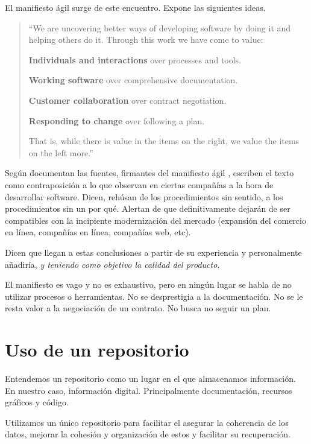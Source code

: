 El manifiesto ágil \cite{ManifiestoAgil} surge de este encuentro. Expone las siguientes ideas.

\begin{quote}
    \itshape{
    ``We are uncovering better ways of developing
    software by doing it and helping others do it.
    Through this work we have come to value:
    
    \textbf{Individuals and interactions} over processes and tools.

    \textbf{Working software} over comprehensive documentation.

    \textbf{Customer collaboration} over contract negotiation.

    \textbf{Responding to change} over following a plan.
    
    That is, while there is value in the items on
    the right, we value the items on the left more.''
    }
\end{quote}

Según documentan las fuentes, firmantes del manifiesto ágil \cite{ManifiestoAgil}, 
escriben el texto como contraposición a lo que observan en ciertas compañías a la
hora de desarrollar software. Dicen, rehúsan de los procedimientos sin sentido,
a los procedimientos sin un por qué. Alertan de que definitivamente dejarán de ser
compatibles con la incipiente modernización del mercado (expansión del comercio en
línea, compañías en línea, compañías web, etc). \cite{HistoriaManifiestoAgilJim}

Dicen que llegan a estas conclusiones a partir de su experiencia \cite{HistoriaManifiestoAgilJim}
y personalmente añadiría, \textit{y teniendo como objetivo la calidad del producto}.

El manifiesto es vago y no es exhaustivo, pero en ningún lugar se habla de no utilizar
procesos o herramientas.
No se desprestigia a la documentación. No se le resta valor a la negociación
de un contrato. No busca no seguir un plan.

\section{Uso de un repositorio}

Entendemos un repositorio como un lugar en el que almacenamos información.
En nuestro caso, información digital. Principalmente documentación, recursos
gráficos y código.

Utilizamos un único repositorio para facilitar el asegurar la coherencia
de los datos, mejorar la cohesión y organización de estos y facilitar su
recuperación.

